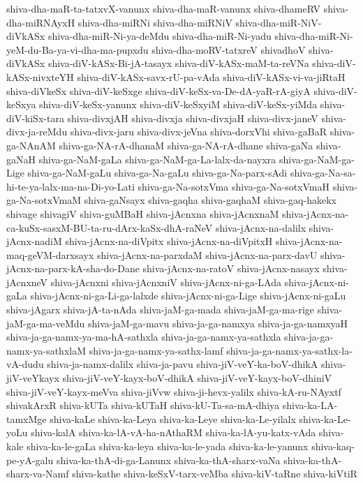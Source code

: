 {shiva-dha-maR-ta-tatxvX-vanunx
shiva-dha-maR-vanunx
shiva-dhameRV
shiva-dha-miRNAyxH
shiva-dha-miRNi
shiva-dha-miRNiV
shiva-dha-miR-NiV-diVkASx
shiva-dha-miR-Ni-ya-deMdu
shiva-dha-miR-Ni-yadu
shiva-dha-miR-Ni-yeM-du-Ba-ya-vi-dha-ma-pupxdu
shiva-dha-moRV-tatxreV
shivadhoV
shiva-diVkASx
shiva-diV-kASx-Bi-jA-tasayx
shiva-diV-kASx-maM-ta-reVNa
shiva-diV-kASx-nivxteYH
shiva-diV-kASx-savx-rU-pa-vAda
shiva-diV-kASx-vi-va-jiRtaH
shiva-diVkeSx
shiva-diV-keSxge
shiva-diV-keSx-va-De-dA-yaR-rA-giyA
shiva-diV-keSxya
shiva-diV-keSx-yanunx
shiva-diV-keSxyiM
shiva-diV-keSx-yiMda
shiva-diV-kiSx-tara
shiva-divxjAH
shiva-divxja
shiva-divxjaH
shiva-divx-janeV
shiva-divx-ja-reMdu
shiva-divx-jaru
shiva-divx-jeVna
shiva-dorxVhi
shiva-gaBaR
shiva-ga-NAnAM
shiva-ga-NA-rA-dhanaM
shiva-ga-NA-rA-dhane
shiva-gaNa
shiva-gaNaH
shiva-ga-NaM-gaLa
shiva-ga-NaM-ga-La-lalx-da-nayxra
shiva-ga-NaM-ga-Lige
shiva-ga-NaM-gaLu
shiva-ga-Na-gaLu
shiva-ga-Na-parx-sAdi
shiva-ga-Na-sa-hi-te-ya-lalx-ma-na-Di-yo-Lati
shiva-ga-Na-sotxVma
shiva-ga-Na-sotxVmaH
shiva-ga-Na-sotxVmaM
shiva-gaNsayx
shiva-gaqha
shiva-gaqhaM
shiva-gaq-hakekx
shivage
shivagiV
shiva-guMBaH
shiva-jAcnxna
shiva-jAcnxnaM
shiva-jAcnx-na-ca-kuSx-sasxM-BU-ta-ru-dArx-kaSx-dhA-raNeV
shiva-jAcnx-na-dalilx
shiva-jAcnx-nadiM
shiva-jAcnx-na-diVpitx
shiva-jAcnx-na-diVpitxH
shiva-jAcnx-na-maq-geVM-darxsayx
shiva-jAcnx-na-parxdaM
shiva-jAcnx-na-parx-davU
shiva-jAcnx-na-parx-kA-sha-do-Dane
shiva-jAcnx-na-ratoV
shiva-jAcnx-nasayx
shiva-jAcnxneV
shiva-jAcnxni
shiva-jAcnxniV
shiva-jAcnx-ni-ga-LAda
shiva-jAcnx-ni-gaLa
shiva-jAcnx-ni-ga-Li-ga-lalxde
shiva-jAcnx-ni-ga-Lige
shiva-jAcnx-ni-gaLu
shiva-jAgarx
shiva-jA-ta-nAda
shiva-jaM-ga-mada
shiva-jaM-ga-ma-rige
shiva-jaM-ga-ma-veMdu
shiva-jaM-ga-mavu
shiva-ja-ga-namxya
shiva-ja-ga-namxyaH
shiva-ja-ga-namx-ya-ma-hA-sathxla
shiva-ja-ga-namx-ya-sathxla
shiva-ja-ga-namx-ya-sathxlaM
shiva-ja-ga-namx-ya-sathx-lamf
shiva-ja-ga-namx-ya-sathx-la-vA-dudu
shiva-ja-namx-dalilx
shiva-ja-pavu
shiva-jiV-veY-ka-boV-dhikA
shiva-jiV-veYkayx
shiva-jiV-veY-kayx-boV-dhikA
shiva-jiV-veY-kayx-boV-dhiniV
shiva-jiV-veY-kayx-meVva
shiva-jiVvw
shiva-ji-hevx-yalilx
shiva-kA-ru-NAyxtf
shivakArxR
shiva-kUTa
shiva-kUTaH
shiva-kU-Ta-sa-mA-dhiya
shiva-ka-LA-tamxMge
shiva-kaLe
shiva-ka-Leya
shiva-ka-Leye
shiva-ka-Le-yilalx
shiva-ka-Le-yoLu
shiva-kalA
shiva-ka-lA-vA-ha-nAthaRM
shiva-ka-lA-yu-katx-vAda
shiva-kale
shiva-ka-le-gaLa
shiva-ka-leya
shiva-ka-le-yada
shiva-ka-le-yanunx
shiva-kaq-pe-yA-galu
shiva-ka-thA-di-ga-Lanunx
shiva-ka-thA-sharx-vaNa
shiva-ka-thA-sharx-va-Namf
shiva-kathe
shiva-keSxV-tarx-veMba
shiva-kiV-taRne
shiva-kiVtiR
}
